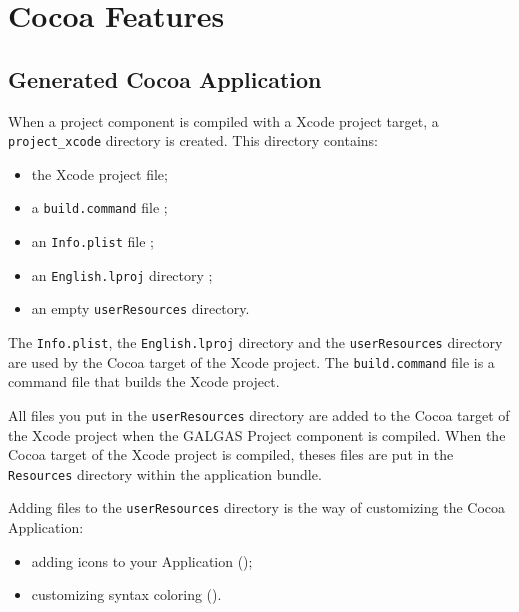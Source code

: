 
\chapter{Cocoa Features}


\section{Generated Cocoa Application}

When a project component is compiled with a Xcode project target, a \texttt{project\_xcode} directory is created. This directory contains:
\begin{itemize}
\item the Xcode project file;
\item a \texttt{build.command} file ;
\item an \texttt{Info.plist} file ;
\item an \texttt{English.lproj} directory ;
\item an empty \texttt{userResources} directory.
\end{itemize}

The \texttt{Info.plist}, the \texttt{English.lproj} directory and the \texttt{userResources} directory are used by the Cocoa target of the Xcode project. The \texttt{build.command} file is a command file that builds the Xcode project.

All files you put in the \texttt{userResources} directory are added to the Cocoa target of the Xcode project when the GALGAS Project component is compiled. When the Cocoa target of the Xcode project is compiled, theses files are put in the \texttt{Resources} directory within the application bundle.

Adding files to the \texttt{userResources} directory is the way of customizing the Cocoa Application:
\begin{itemize}
\item adding icons to your Application ();
\item customizing syntax coloring (). 
\end{itemize}





